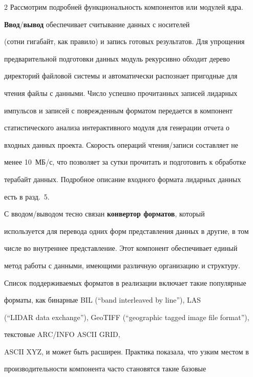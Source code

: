 \begin{multicols}{2}
Рассмотрим подробней функциональность компонентов или модулей ядра.

   

   \textbf{Ввод}/\textbf{вывод} обеспечивает считывание данных с носителей 

(сотни гигабайт, как правило) и запись готовых результатов. Для упрощения 

предварительной подготовки данных модуль рекурсивно обходит дерево 

директорий файловой системы и автоматически распознает пригодные для 

чтения файлы с данными. Число успешно прочитанных записей лидарных 

импульсов и записей с поврежденным форматом передается в компонент 

статистического анализа интерактивного модуля для генерации отчета о 

входных данных проекта. Скорость операций чтения/записи составляет не 

менее 10~МБ/с, что позволяет за сутки прочитать и подготовить к обработке 

терабайт данных. Подробное описание входного формата лидарных данных 

есть в разд.~5.

{



}

   

   С вводом/выводом тесно связан \textbf{конвертор форматов}, который 

используется для перевода одних форм представления данных в другие, в том 

чис\-ле во внутреннее представление. Этот компонент обеспечивает единый 

метод работы с данными, име\-ющи\-ми различную организацию и структуру. 

Список поддерживаемых форматов в реализации включает такие популярные 

форматы, как бинарные BIL (``band interleaved by line''), LAS

(``LIDAR data exchange''), GeoTIFF (``geographic tagged image file format''), 

текстовые ARC/INFO ASCII GRID, 

ASCII XYZ, и может быть расширен. Практика показала, что узким местом в 

про\-из\-во\-ди\-тель\-ности компонента часто становятся такие базовые 


\end{multicols}
